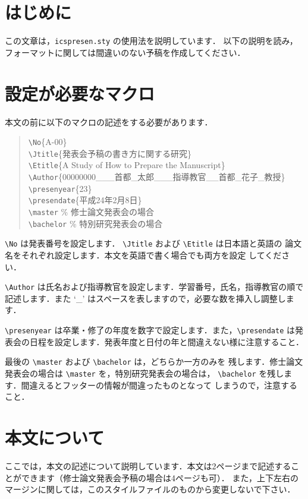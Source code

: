 \documentclass{jarticle}
\begin{document}
\mktitle
%
\renewcommand{\baselinestretch}{1.1}\small
%
\section{はじめに}
この文章は，{\tt icspresen.sty} の使用法を説明しています．
以下の説明を読み，フォーマットに関しては間違いのない予稿を作成してください．

\section{設定が必要なマクロ}

本文の前に以下のマクロの記述をする必要があります．
\newcommand{\tbs}{\textbackslash}
\newcommand{\macrocom}[1]{{\tt \textbackslash#1}}

\begin{quote}
\macrocom{No}\{A-00\}\\
\macrocom{Jtitle}\{発表会予稿の書き方に関する研究\}\\
\macrocom{Etitle}\{A Study of How to Prepare the Manuscript\}\\
\macrocom{Author}\{00000000\_\_\_首都\_太郎\_\_\_指導教官\_\_首都\_花子\_教授\}\\
\macrocom{presenyear}\{23\}\\
\macrocom{presendate}\{平成24年2月8日\}\\
\macrocom{master}   \% 修士論文発表会の場合\\
\macrocom{bachelor} \% 特別研究発表会の場合
\end{quote}

\macrocom{No} は発表番号を設定します．
\macrocom{Jtitle} および \macrocom{Etitle} は日本語と英語の
論文名をそれぞれ設定します．本文を英語で書く場合でも両方を設定
してください．

\macrocom{Author} は氏名および指導教官を設定します．学習番号，氏名，指導教官の順で
記述します．また `\_' はスペースを表しますので，必要な数を挿入し調整します．

\macrocom{presenyear} は卒業・修了の年度を数字で設定します．また，\macrocom{presendate} 
は発表会の日程を設定します．発表年度と日付の年と間違えない様に注意すること．

最後の \macrocom{master} および \macrocom{bachelor} は，どちらか一方のみを
残します．修士論文発表会の場合は \macrocom{master} を，特別研究発表会の場合は，
\macrocom{bachelor} を残します．間違えるとフッターの情報が間違ったものとなって
しまうので，注意すること．

\section{本文について}
ここでは，本文の記述について説明しています．本文は2ページまで記述することができます（修士論文発表会予稿の場合は4ページも可）．
また，上下左右のマージンに関しては，このスタイルファイルのものから変更しないで下さい．
\end{document}
